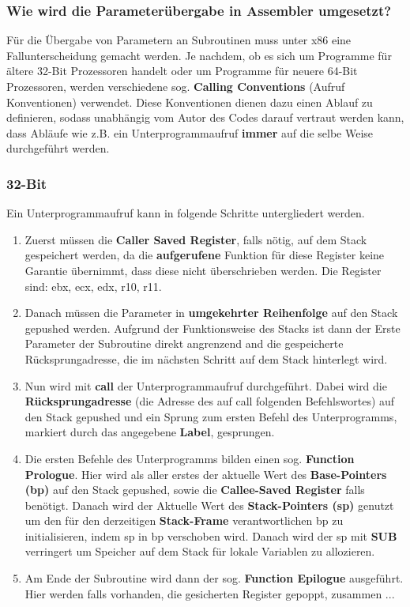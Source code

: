 \documentclass[12pt]{article}
\begin{document}
\subsubsection{Wie wird die Parameterübergabe in Assembler umgesetzt?}
Für die Übergabe von Parametern an Subroutinen muss unter x86 eine Fallunterscheidung gemacht werden. Je nachdem, ob es sich um Programme für ältere 32-Bit Prozessoren handelt oder um Programme für neuere 64-Bit Prozessoren, werden verschiedene sog. \textbf{Calling Conventions} (Aufruf Konventionen) verwendet. Diese Konventionen dienen dazu einen Ablauf zu definieren, sodass unabhängig vom Autor des Codes darauf vertraut werden kann, dass Abläufe wie z.B. ein Unterprogrammaufruf \textbf{immer} auf die selbe Weise durchgeführt werden.

\subsubsection*{32-Bit}
Ein Unterprogrammaufruf kann in folgende Schritte untergliedert werden.
\begin{enumerate}
\item Zuerst müssen die \textbf{Caller Saved Register}, falls nötig, auf dem Stack gespeichert werden, da die \textbf{aufgerufene} Funktion für diese Register keine Garantie übernimmt, dass diese nicht überschrieben werden. Die Register sind: ebx, ecx, edx, r10, r11.
\item Danach müssen die Parameter in \textbf{umgekehrter Reihenfolge} auf den Stack gepushed werden. Aufgrund der Funktionsweise des Stacks ist dann der Erste Parameter der Subroutine direkt angrenzend and die gespeicherte Rücksprungadresse, die im nächsten Schritt auf dem Stack hinterlegt wird.
\item Nun wird mit \textbf{call} der Unterprogrammaufruf durchgeführt. Dabei wird die \textbf{Rücksprungadresse} (die Adresse des auf call folgenden Befehlswortes) auf den Stack gepushed und ein Sprung zum ersten Befehl des Unterprogramms, markiert durch das angegebene \textbf{Label}, gesprungen.
\item Die ersten Befehle des Unterprogramms bilden einen sog. \textbf{Function Prologue}. Hier wird als aller erstes der aktuelle Wert des \textbf{Base-Pointers (bp)} auf den Stack gepushed, sowie die \textbf{Callee-Saved Register} falls benötigt. Danach wird der Aktuelle Wert des \textbf{Stack-Pointers (sp)} genutzt um den für den derzeitigen \textbf{Stack-Frame} verantwortlichen bp zu initialisieren, indem sp in bp verschoben wird. Danach wird der sp mit \textbf{SUB} verringert um Speicher auf dem Stack für lokale Variablen zu allozieren.
\item Am Ende der Subroutine wird dann der sog. \textbf{Function Epilogue} ausgeführt. Hier werden falls vorhanden, die gesicherten Register gepoppt, zusammen ...
\end{enumerate}
\end{document}
